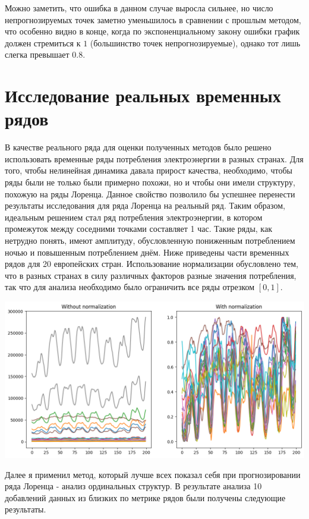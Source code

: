 \documentclass[a4paper, 12pt]{extarticle}
\begin{document}
Можно заметить, что ошибка в данном случае выросла сильнее, но число непрогнозируемых точек заметно уменьшилось в сравнении с прошлым методом, что особенно видно в конце, когда по экспоненциальному закону ошибки график должен стремиться к $1$ (большинство точек непрогнозируемые), однако тот лишь слегка превышает $0.8$.

\newpage
\section{Исследование реальных временных рядов}

В качестве реального ряда для оценки полученных методов было решено использовать временные ряды потребления электроэнергии в разных странах. Для того, чтобы нелинейная динамика давала прирост качества, необходимо, чтобы ряды были не только были примерно похожи, но и чтобы они имели структуру, похожую на ряды Лоренца. Данное свойство позволило бы успешнее перенести результаты исследования для ряда Лоренца на реальный ряд. Таким образом, идеальным решением стал ряд потребления электроэнергии, в котором промежуток между соседними точками составляет 1 час. Такие ряды, как нетрудно понять, имеют амплитуду, обусловленную пониженным потреблением ночью и повышенным потреблением днём. Ниже приведены части временных рядов для 20 европейских стран. Использование нормализации обусловлено тем, что в разных странах в силу различных факторов разные значения потребления, так что для анализа необходимо было ограничить все ряды отрезком $[0,1]$.

\begin{center}
    \includegraphics[width=\textwidth]{img/consumption_series.png}
\end{center}

Далее я применил метод, который лучше всех показал себя при прогнозировании ряда Лоренца - анализ ординальных структур. В результате анализа 10 добавлений данных из близких по метрике рядов были получены следующие результаты. 
\end{document}
